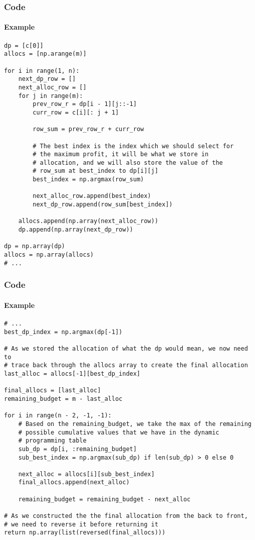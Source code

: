 
\begin{frame}[fragile]

\frametitle{Code}
\framesubtitle{Example}

\begin{lstlisting}[style=Python, basicstyle=\tiny, numbers=none, framexrightmargin=-20pt]
dp = [c[0]]
allocs = [np.arange(m)]

for i in range(1, n):
	next_dp_row = []
	next_alloc_row = []
	for j in range(m):
		prev_row_r = dp[i - 1][j::-1]
		curr_row = c[i][: j + 1]

		row_sum = prev_row_r + curr_row

		# The best index is the index which we should select for
		# the maximum profit, it will be what we store in
		# allocation, and we will also store the value of the
		# row_sum at best_index to dp[i][j]
		best_index = np.argmax(row_sum)

		next_alloc_row.append(best_index)
		next_dp_row.append(row_sum[best_index])

	allocs.append(np.array(next_alloc_row))
	dp.append(np.array(next_dp_row))

dp = np.array(dp)
allocs = np.array(allocs)
# ...
\end{lstlisting}

\end{frame}


\begin{frame}[fragile]

\frametitle{Code}
\framesubtitle{Example}

\begin{lstlisting}[style=Python, basicstyle=\tiny, numbers=none, framexrightmargin=-20pt]
# ...
best_dp_index = np.argmax(dp[-1])

# As we stored the allocation of what the dp would mean, we now need to
# trace back through the allocs array to create the final allocation
last_alloc = allocs[-1][best_dp_index]

final_allocs = [last_alloc]
remaining_budget = m - last_alloc

for i in range(n - 2, -1, -1):
	# Based on the remaining_budget, we take the max of the remaining
	# possible cumulative values that we have in the dynamic
	# programming table
	sub_dp = dp[i, :remaining_budget]
	sub_best_index = np.argmax(sub_dp) if len(sub_dp) > 0 else 0

	next_alloc = allocs[i][sub_best_index]
	final_allocs.append(next_alloc)

	remaining_budget = remaining_budget - next_alloc

# As we constructed the the final allocation from the back to front,
# we need to reverse it before returning it
return np.array(list(reversed(final_allocs)))
\end{lstlisting}

\end{frame}

